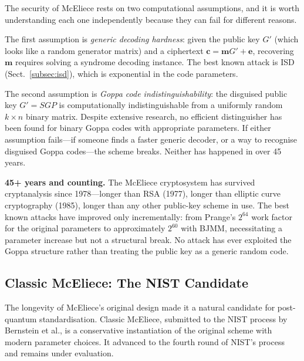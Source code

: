 The security of McEliece rests on two computational assumptions, and it is worth understanding each one independently because they can fail for different reasons.

The first assumption is \emph{generic decoding hardness}: given the public key $G'$ (which looks like a random generator matrix) and a ciphertext $\mathbf{c} = \mathbf{m}G' + \mathbf{e}$, recovering $\mathbf{m}$ requires solving a syndrome decoding instance.  The best known attack is ISD (Sect.~\ref{subsec:isd}), which is exponential in the code parameters.

The second assumption is \emph{Goppa code indistinguishability}: the disguised public key $G' = SGP$ is computationally indistinguishable from a uniformly random $k \times n$ binary matrix.  Despite extensive research, no efficient distinguisher has been found for binary Goppa codes with appropriate parameters.  If either assumption fails---if someone finds a faster generic decoder, or a way to recognise disguised Goppa codes---the scheme breaks.  Neither has happened in over 45 years.

\begin{svgraybox}
\textbf{45+ years and counting.}
The McEliece cryptosystem has survived cryptanalysis since 1978---longer than RSA (1977), longer than elliptic curve cryptography (1985), longer than any other public-key scheme in use.  The best known attacks have improved only incrementally: from Prange's $2^{64}$ work factor for the original parameters to approximately $2^{60}$ with BJMM, necessitating a parameter increase but not a structural break.  No attack has ever exploited the Goppa structure rather than treating the public key as a generic random code.
\end{svgraybox}


\subsection{Classic McEliece: The NIST Candidate}
\label{subsec:classic-mceliece-nist}

The longevity of McEliece's original design made it a natural candidate for post-quantum standardisation.  Classic McEliece, submitted to the NIST process by Bernstein et al., is a conservative instantiation of the original scheme with modern parameter choices.  It advanced to the fourth round of NIST's process and remains under evaluation.

